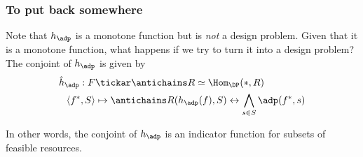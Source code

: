  


\subsubsection{To put back somewhere}
Note that $h_\adp$ is a monotone function but is \emph{not} a design problem. Given that it is a monotone function, what happens if we try to turn it into a design problem? The conjoint of $h_\adp$ is given by
\begin{equation}
\begin{aligned}
\hat h_\adp : F &\tickar \antichains R \simeq \Hom_\DP(\ast, R) \\
\langle f^*, S \rangle &\mapsto \antichains R(h_\adp(f), S) \leftrightarrow \bigwedge_{s\in S} \adp(f^*, s)
\end{aligned}
\end{equation}

In other words, the conjoint of $h_\adp$ is an indicator function for subsets of feasible resources.
